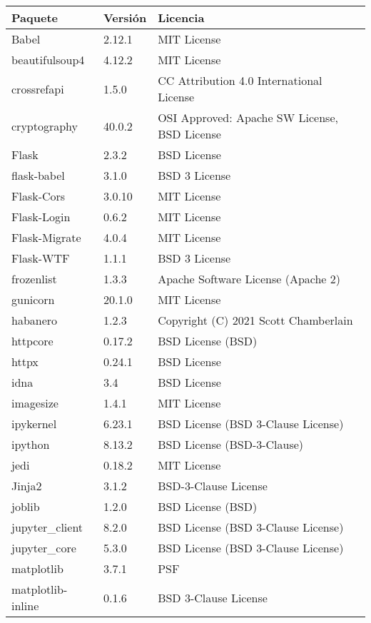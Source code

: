 \begin{table}[h]
\centering
\begin{tabular}{|l|l|l|}
\hline
\textbf{Paquete} & \textbf{Versión}& \textbf{Licencia} \\ \hline
Babel & 2.12.1 &  MIT License \\ \hline
beautifulsoup4 & 4.12.2 & MIT License \\ \hline
crossrefapi & 1.5.0 &  CC Attribution 4.0 International License \\ \hline
cryptography & 40.0.2 &  OSI Approved: Apache SW License, BSD License \\ \hline
Flask & 2.3.2 &  BSD License \\ \hline
flask-babel & 3.1.0 &  BSD 3 License \\ \hline
Flask-Cors & 3.0.10 &  MIT License \\ \hline
Flask-Login & 0.6.2 &  MIT License \\ \hline
Flask-Migrate & 4.0.4 &  MIT License \\ \hline
Flask-WTF & 1.1.1 &  BSD 3 License \\ \hline
frozenlist & 1.3.3 &  Apache Software License (Apache 2) \\ \hline
gunicorn & 20.1.0 &  MIT License \\ \hline
habanero & 1.2.3 & Copyright (C) 2021 Scott Chamberlain \\ \hline
httpcore & 0.17.2 &  BSD License (BSD) \\ \hline
httpx & 0.24.1 &  BSD License \\ \hline
idna & 3.4 &  BSD License \\ \hline
imagesize & 1.4.1 &  MIT License \\ \hline
ipykernel & 6.23.1 &  BSD License (BSD 3-Clause License) \\ \hline
ipython & 8.13.2 &  BSD License (BSD-3-Clause) \\ \hline
jedi & 0.18.2 &  MIT License \\ \hline
Jinja2 & 3.1.2 &  BSD-3-Clause License \\ \hline
joblib & 1.2.0 &  BSD License (BSD) \\ \hline
jupyter\_client & 8.2.0 & BSD License (BSD 3-Clause License) \\ \hline
jupyter\_core & 5.3.0 & BSD License (BSD 3-Clause License) \\ \hline
matplotlib & 3.7.1 & PSF \\ \hline
matplotlib-inline & 0.1.6 & BSD 3-Clause License \\ \hline

\end{tabular}
\end{table}
